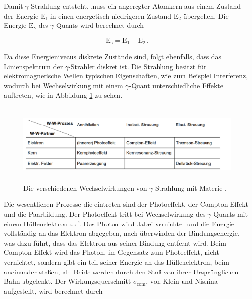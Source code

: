 \begin{flushleft}
    Damit $\gamma$-Strahlung entsteht, muss ein angeregter Atomkern aus einem Zustand der Energie $\text{E}_{1}$ in einen energetisch niedrigeren Zustand $\text{E}_{2}$ übergehen.
    Die Energie $\text{E}_{\gamma}$ des $\gamma$-Quants wird berechnet durch
\end{flushleft}

\begin{equation}
    \text{E}_{\gamma} = \text{E}_{1} - \text{E}_{2}\,. \label{4}
\end{equation}

\begin{flushleft}
    Da diese Energieniveaus diskrete Zustände sind, folgt ebenfalls, dass das Linienspektrum der $\gamma$-Strahler diskret ist.
    Die Strahlung besitzt für elektromagnetische Wellen typischen Eigenschaften, wie zum Beispiel Interferenz, wodurch bei Wechselwirkung mit einem $\gamma$-Quant unterschiedliche Effekte auftreten, wie in Abbildung \ref{Abbildung1} zu sehen.
\end{flushleft}

\begin{figure}[H]
    \centering
    \includegraphics[height=40mm]{bilder/Ab1.png}
    \caption{Die verschiedenen Wechselwirkungen von $\gamma$-Strahlung mit Materie \cite{a1}. \label{Abbildung1} }
\end{figure}

\begin{flushleft}
      Die wesentlichen Prozesse die eintreten sind der Photoeffekt, der Compton-Effekt und die Paarbildung. 
      Der Photoeffekt tritt bei Wechselwirkung des $\gamma$-Quants mit einem Hüllenelektron auf. 
      Das Photon wird dabei vernichtet und die Energie vollständig an das Elektron abgegeben, nach überwinden der Bindungsenergie, was dazu führt, dass das Elektron aus seiner Bindung entfernt wird.
      Beim Compton-Effekt wird das Photon, im Gegensatz zum Photoeffekt, nicht vernichtet, sondern gibt ein teil seiner Energie an das Hüllenelektron, beim aneinander stoßen, ab.
      Beide werden durch den Stoß von ihrer Ursprünglichen Bahn abgelenkt.
      Der Wirkungsquerschnitt $\sigma_{\text{com}}$, von Klein und Nishina aufgestellt, wird berechnet durch
\end{flushleft}


